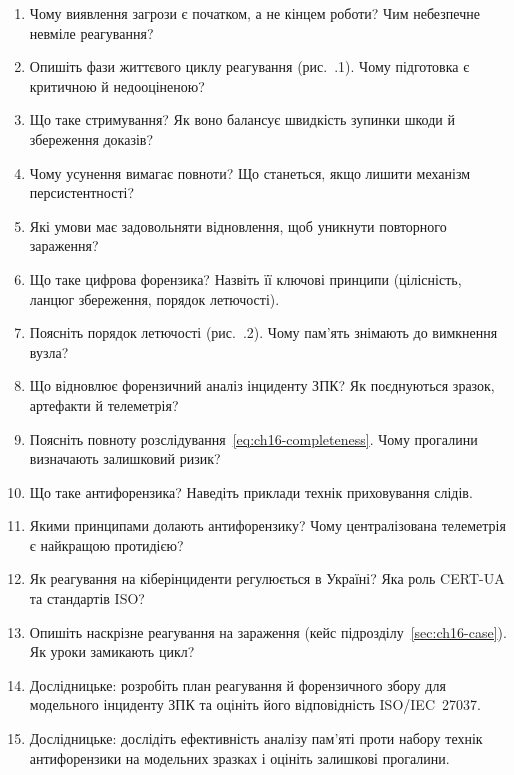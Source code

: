 \selfcheck
\begin{enumerate}
\item Чому виявлення загрози є початком, а не кінцем роботи? Чим небезпечне невміле реагування?
\item Опишіть фази життєвого циклу реагування (рис.~\thechapter.1). Чому підготовка є критичною й недооціненою?
\item Що таке стримування? Як воно балансує швидкість зупинки шкоди й збереження доказів?
\item Чому усунення вимагає повноти? Що станеться, якщо лишити механізм персистентності?
\item Які умови має задовольняти відновлення, щоб уникнути повторного зараження?
\item Що таке цифрова форензика? Назвіть її ключові принципи (цілісність, ланцюг збереження, порядок летючості).
\item Поясніть порядок летючості (рис.~\thechapter.2). Чому пам'ять знімають до вимкнення вузла?
\item Що відновлює форензичний аналіз інциденту ЗПК? Як поєднуються зразок, артефакти й телеметрія?
\item Поясніть повноту розслідування~\eqref{eq:ch16-completeness}. Чому прогалини визначають залишковий ризик?
\item Що таке антифорензика? Наведіть приклади технік приховування слідів.
\item Якими принципами долають антифорензику? Чому централізована телеметрія є найкращою протидією?
\item Як реагування на кіберінциденти регулюється в Україні? Яка роль CERT-UA та стандартів ISO?
\item Опишіть наскрізне реагування на зараження (кейс підрозділу~\ref{sec:ch16-case}). Як уроки замикають цикл?
\item Дослідницьке: розробіть план реагування й форензичного збору для модельного інциденту ЗПК та оцініть його відповідність ISO/IEC~27037.
\item Дослідницьке: дослідіть ефективність аналізу пам'яті проти набору технік антифорензики на модельних зразках і оцініть залишкові прогалини.
\end{enumerate}
